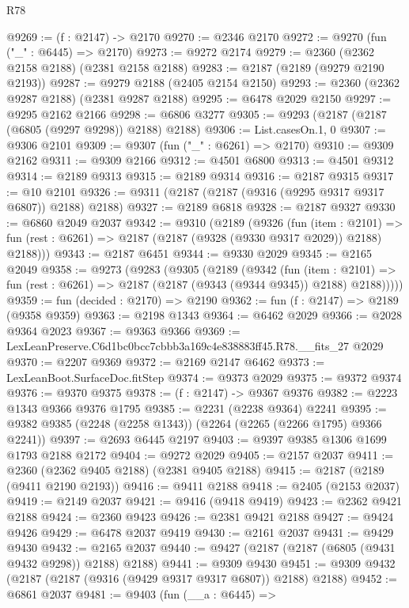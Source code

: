\begin{lexlean}{R78}
\begin{coremodule}
@9269 := (f : @2147) -> @2170
@9270 := @2346 @2170
@9272 := @9270 (fun ("_" : @6445) => @2170)
@9273 := @9272 @2174
@9279 := @2360 (@2362 @2158 @2188) (@2381 @2158 @2188)
@9283 := @2187 (@2189 (@9279 @2190 @2193))
@9287 := @9279 @2188 (@2405 @2154 @2150)
@9293 := @2360 (@2362 @9287 @2188) (@2381 @9287 @2188)
@9295 := @6478 @2029 @2150
@9297 := @9295 @2162 @2166
@9298 := @6806 @3277
@9305 := @9293 (@2187 (@2187 (@6805 (@9297 @9298)) @2188) @2188)
@9306 := List.casesOn.{1, 0}
@9307 := @9306 @2101
@9309 := @9307 (fun ("_" : @6261) => @2170)
@9310 := @9309 @2162
@9311 := @9309 @2166
@9312 := @4501 @6800
@9313 := @4501 @9312
@9314 := @2189 @9313
@9315 := @2189 @9314
@9316 := @2187 @9315
@9317 := @10 @2101
@9326 := @9311 (@2187 (@2187 (@9316 (@9295 @9317 @9317 @6807)) @2188) @2188)
@9327 := @2189 @6818
@9328 := @2187 @9327
@9330 := @6860 @2049 @2037
@9342 := @9310
    (@2189
      (@9326
        (fun (item : @2101) =>
        fun (rest : @6261) => @2187 (@2187 (@9328 (@9330 @9317 @2029)) @2188) @2188)))
@9343 := @2187 @6451
@9344 := @9330 @2029
@9345 := @2165 @2049
@9358 := @9273
    (@9283
      (@9305
        (@2189
          (@9342
            (fun (item : @2101) =>
            fun (rest : @6261) => @2187 (@2187 (@9343 (@9344 @9345)) @2188) @2188)))))
@9359 := fun (decided : @2170) => @2190
@9362 := fun (f : @2147) => @2189 (@9358 @9359)
@9363 := @2198 @1343
@9364 := @6462 @2029
@9366 := @2028 @9364 @2023
@9367 := @9363 @9366
@9369 := LexLeanPreserve.C6d1bc0bcc7cbbb3a169c4e838883ff45.R78.__fits_27 @2029
@9370 := @2207 @9369
@9372 := @2169 @2147 @6462
@9373 := LexLeanBoot.SurfaceDoc.fitStep
@9374 := @9373 @2029
@9375 := @9372 @9374
@9376 := @9370 @9375
@9378 := (f : @2147) -> @9367 @9376
@9382 := @2223 @1343 @9366 @9376 @1795
@9385 := @2231 (@2238 @9364) @2241
@9395 := @9382 @9385 (@2248 (@2258 @1343)) (@2264 (@2265 (@2266 @1795) @9366 @2241))
@9397 := @2693 @6445 @2197
@9403 := @9397 @9385 @1306 @1699 @1793 @2188 @2172
@9404 := @9272 @2029
@9405 := @2157 @2037
@9411 := @2360 (@2362 @9405 @2188) (@2381 @9405 @2188)
@9415 := @2187 (@2189 (@9411 @2190 @2193))
@9416 := @9411 @2188
@9418 := @2405 (@2153 @2037)
@9419 := @2149 @2037
@9421 := @9416 (@9418 @9419)
@9423 := @2362 @9421 @2188
@9424 := @2360 @9423
@9426 := @2381 @9421 @2188
@9427 := @9424 @9426
@9429 := @6478 @2037 @9419
@9430 := @2161 @2037
@9431 := @9429 @9430
@9432 := @2165 @2037
@9440 := @9427 (@2187 (@2187 (@6805 (@9431 @9432 @9298)) @2188) @2188)
@9441 := @9309 @9430
@9451 := @9309 @9432 (@2187 (@2187 (@9316 (@9429 @9317 @9317 @6807)) @2188) @2188)
@9452 := @6861 @2037
@9481 := @9403
    (fun (__a : @6445) =>

\end{coremodule}
\end{lexlean}
